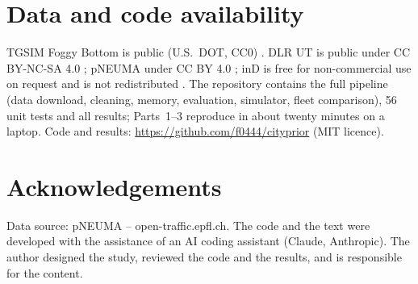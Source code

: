 \documentclass[11pt,a4paper]{article}
\begin{document}
\section*{Data and code availability}
TGSIM Foggy Bottom is public (U.S.\ DOT, CC0) \citep{tgsim_fb}. DLR UT is public under CC BY-NC-SA 4.0 \citep{dlr_ut}; pNEUMA under CC BY 4.0 \citep{pneuma_zenodo}; inD is free for non-commercial use on request and is not redistributed \citep{bock2020ind}. The repository contains the full pipeline (data download, cleaning, memory, evaluation, simulator, fleet comparison), 56 unit tests and all results; Parts~1--3 reproduce in about twenty minutes on a laptop. Code and results: \url{https://github.com/f0444/cityprior} (MIT licence).

\section*{Acknowledgements}
Data source: pNEUMA -- open-traffic.epfl.ch.
The code and the text were developed with the assistance of an AI coding assistant (Claude, Anthropic). The author designed the study, reviewed the code and the results, and is responsible for the content.



\end{document}
